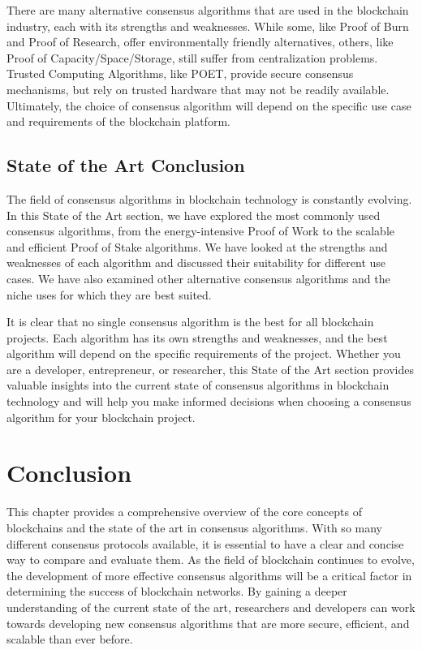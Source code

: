 There are many alternative consensus algorithms that are used in the blockchain industry, each with its strengths and weaknesses. While some, like Proof of Burn and Proof of Research, offer environmentally friendly alternatives, others, like Proof of Capacity/Space/Storage, still suffer from centralization problems. Trusted Computing Algorithms, like POET, provide secure consensus mechanisms, but rely on trusted hardware that may not be readily available. Ultimately, the choice of consensus algorithm will depend on the specific use case and requirements of the blockchain platform.

\subsection*{State of the Art Conclusion}
The field of consensus algorithms in blockchain technology is constantly evolving. In this State of the Art section, we have explored the most commonly used consensus algorithms, from the energy-intensive Proof of Work to the scalable and efficient Proof of Stake algorithms. We have looked at the strengths and weaknesses of each algorithm and discussed their suitability for different use cases. We have also examined other alternative consensus algorithms and the niche uses for which they are best suited.

It is clear that no single consensus algorithm is the best for all blockchain projects. Each algorithm has its own strengths and weaknesses, and the best algorithm will depend on the specific requirements of the project. Whether you are a developer, entrepreneur, or researcher, this State of the Art section provides valuable insights into the current state of consensus algorithms in blockchain technology and will help you make informed decisions when choosing a consensus algorithm for your blockchain project.

\section{Conclusion}
This chapter provides a comprehensive overview of the core concepts of blockchains and the state of the art in consensus algorithms. With so many different consensus protocols available, it is essential to have a clear and concise way to compare and evaluate them. As the field of blockchain continues to evolve, the development of more effective consensus algorithms will be a critical factor in determining the success of blockchain networks. By gaining a deeper understanding of the current state of the art, researchers and developers can work towards developing new consensus algorithms that are more secure, efficient, and scalable than ever before.
